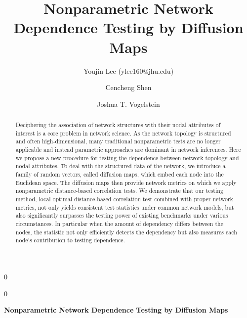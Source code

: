\documentclass[11pt]{article}
\theoremstyle{definition}
\newcommand{\blind}{0}
\begin{document}
\def\spacingset#1{\renewcommand{\baselinestretch}%
{#1}\small\normalsize} \spacingset{1}

\title{\bf Nonparametric Network Dependence Testing by Diffusion Maps}
\blind
{\author[1]{Youjin Lee (ylee160@jhu.edu)} %
	\author[2]{Cencheng Shen} %
	\author[2,3,4]{Joshua T. Vogelstein}
  \date{}
	\maketitle
} \fi

	\blind
	{
		\bigskip
		\bigskip
		\bigskip
		\begin{center}
			{\LARGE\bf Nonparametric Network Dependence Testing by Diffusion Maps}
		\end{center}
		\medskip
	} \fi

\begin{abstract}
Deciphering the association of network structures with their nodal attributes of interest is a core problem in network science. As the network topology is structured and often high-dimensional, many traditional nonparametric tests are no longer applicable and instead parametric approaches are dominant in network inferences. Here we propose a new procedure for testing the dependence between network topology and nodal attributes. To deal with the structured data of the network, we introduce a family of random vectors, called diffusion maps, which embed each node into the Euclidean space. The diffusion maps then provide network metrics on which we apply nonparametric distance-based correlation tests. We demonstrate that our testing method, local optimal distance-based correlation test combined with proper network metrics, not only yields consistent test statistics under common network models, but also significantly surpasses the testing power of existing benchmarks under various circumstances. In particular when the amount of dependency differs between the nodes, the statistic not only efficiently detects the dependency but also measures each node's contribution to testing dependence. 
\end{abstract}
\end{document}
